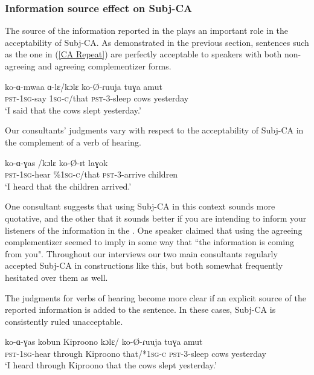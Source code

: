 \documentclass[output=paper
,newtxmath
,modfonts
,nonflat]{langsci/langscibook}
\begin{document}
\subsubsection{Information source effect on Subj-CA}

The source of the information reported in the  plays an important role in the acceptability of Subj-CA. As demonstrated in the previous section, sentences such as the one in (\ref{CA Repeat}) are perfectly acceptable to speakers with both non-agreeing and agreeing complementizer forms.

\ea \label{CA Repeat}
\gll	ko-ɑ-mwaa ɑ-lɛ/kɔlɛ ko-\O-ɾuuja tuɣa amut \\
\textsc{pst}-1\textsc{sg}-say 1\textsc{sg-c}/that \textsc{pst}-3-sleep cows yesterday \\
\glt `I said that the cows slept yesterday.'
\z

\noindent Our consultants' judgments vary with respect to the acceptability of Subj-CA in the complement of a verb of hearing.  

\ea
\gll ko-ɑ-ɣas /kɔlɛ ko-\O-ɪt laɣok \\
\textsc{pst}-1\textsc{sg}-hear \%1\textsc{sg-c}/that \textsc{pst}-3-arrive children \\
\glt `I heard that the children arrived.'
\z

\noindent One consultant suggests that using Subj-CA in this context sounds more quotative, and the other that it sounds better if you are intending to inform your listeners of the information in the . One speaker claimed that using the agreeing complementizer seemed to imply in some way that ``the information is coming from you". Throughout our interviews our two main consultants regularly accepted Subj-CA in constructions like this, but both somewhat frequently hesitated over them as well. 

The judgments for verbs of hearing become more clear if an explicit source of the reported information is added to the sentence. In these cases, Subj-CA is consistently ruled unacceptable.  

\ea 
\gll ko-ɑ-ɣas kobun Kiproono kɔlɛ/ ko-\O-ɾuuja tuɣa amut \\
\textsc{pst}-1\textsc{sg}-hear through Kiproono that/*1\textsc{sg-c} \textsc{pst}-3-sleep cows yesterday \\
\trans `I heard through Kiproono that the cows slept yesterday.' 
\z
\end{document}

